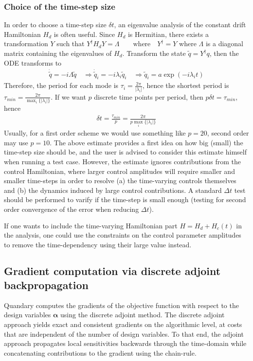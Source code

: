 \documentclass[11pt]{article}
\begin{document}
    \subsubsection{Choice of the time-step size}
    In order to choose a time-step size $\delta t$, an eigenvalue analysis of
    the constant drift Hamiltonian $H_d$ is often useful. Since $H_d$ is Hermitian, there exists a transformation $Y$ such that $Y^{\dagger}H_d Y = \Lambda \qquad  \text{where} \quad Y^{\dagger} = Y$ where $\Lambda$ is a diagonal matrix containing the eigenvalues of $H_d$.
       Transform the state $\tilde q = Y^{\dagger} q$, then the ODE transforms to 
       \begin{align*}
         \dot \tilde q = -i \Lambda \tilde q \quad \Rightarrow \dot \tilde q_i =
         -i\lambda_i \tilde q_i \quad \Rightarrow \tilde q_i = a
         \exp(-i\lambda_i t)
       \end{align*}
       Therefore, the period for each mode is $\tau_i =
       \frac{2\pi}{|\lambda_i|}$, hence the shortest period is $\tau_{min} =
       \frac{2\pi}{\max_i\{|\lambda_i|\}}$. If we want $p$ discrete time points
       per period, then $p\delta t = \tau_{min}$, hence 
       \begin{align} \label{eq:timestepsize}
         \delta t = \frac{\tau_{min}}{p} = \frac{2\pi}{p\max_i\{|\lambda_i|\}}
       \end{align}
       Usually, for a first order scheme we would use something like $p=20$,
       second order may use $p=10$. The above estimate provides a first idea on how big (small) the time-step size should be, and the user is advised to consider this estimate himself when running a test case. However, the estimate ignores contributions from the control Hamiltonian, where larger control amplitudes will require smaller and smaller time-steps in order to resolve (a) the time-varying controls themselves and (b) the dynamics induced by large control contributions. A standard $\Delta t$ test should be performed to varify if the time-step is small enough (testing for second order convergence of the error when reducing $\Delta t$). 

       If one wants to include the time-varying Hamiltonian part $H = H_d +
       H_c(t)$ in the analysis, one could use the constraints on the control
       parameter amplitudes to remove the time-dependency using their large
       value instead.       


  
  \subsection{Gradient computation via discrete adjoint backpropagation}
   Quandary computes the gradients of the objective function with respect to the design variables $\boldsymbol{\alpha}$ using the discrete adjoint method. The discrete adjoint approach yields exact and consistent gradients on the algorithmic level, at costs that are independent of the number of design variables.    
   To that end, the adjoint approach propagates local sensitivities backwards through the time-domain while concatenating contributions to the gradient using the chain-rule.
\end{document}

